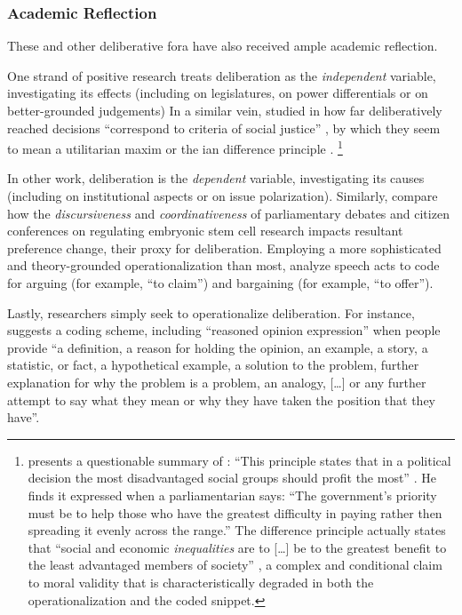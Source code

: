 \subsubsection{Academic Reflection}
These and other deliberative fora have also received ample academic reflection.

One strand of positive research treats deliberation as the \emph{independent} variable, investigating its effects (including \citealt{Bachtiger2005} on legislatures, \citealt{Hibbings2002} on power differentials or \citealt{Jackman2008} on better-grounded judgements) %
In a similar vein, \cite{Steiner2004} studied in how far deliberatively reached decisions ``correspond to criteria of social justice'' \cite[13]{Steiner2012}, by which they seem to mean a utilitarian maxim \citep{Bentham1789} or the \citeauthor{Rawls-1971}ian difference principle \cite[95]{Steiner2012}.
\footnote{
	\citeauthor{Steiner2012} presents a questionable summary of \citeauthor{Rawls-1971}:
	``This principle states that in a political decision the most disadvantaged social groups should profit the most'' \citep[95]{Steiner2012}.
	He finds it expressed when a parliamentarian says:
	``The government's priority must be to help those who have the greatest difficulty in paying rather then spreading it evenly across the range.''
	The difference principle actually states that ``social and economic \emph{inequalities} are to [\ldots] be to the greatest benefit to the least advantaged members of society'' \cite[266]{Rawls-1971}, a complex and conditional claim to moral validity that is characteristically degraded in both the operationalization and the coded snippet.
}

In other work, deliberation is the \emph{dependent} variable, investigating its causes (including \citealt{Steiner2004} on institutional aspects or \citealt[13]{Steiner2012} on issue polarization).
Similarly, \cite{Landwehr2010} compare how the \emph{discursiveness} and \emph{coordinativeness} of parliamentary debates and citizen conferences on regulating embryonic stem cell research impacts resultant preference change, their proxy for deliberation.
Employing a more sophisticated and theory-grounded operationalization than most, \citet[377]{Landwehr2010} analyze speech acts to code for arguing (for example, ``to claim'') and bargaining (for example, ``to offer'').%

Lastly, researchers simply seek to operationalize deliberation.
For instance, \cite{Stromer-Galley2007} suggests a coding scheme, including ``reasoned opinion expression'' when people provide ``a definition, a reason for holding the opinion, an example, a story, a statistic, or fact, a hypothetical example, a solution to the problem, further explanation for why the problem is a problem, an analogy, [\ldots] or any further attempt to say what they mean or why they have taken the position that they have''.

